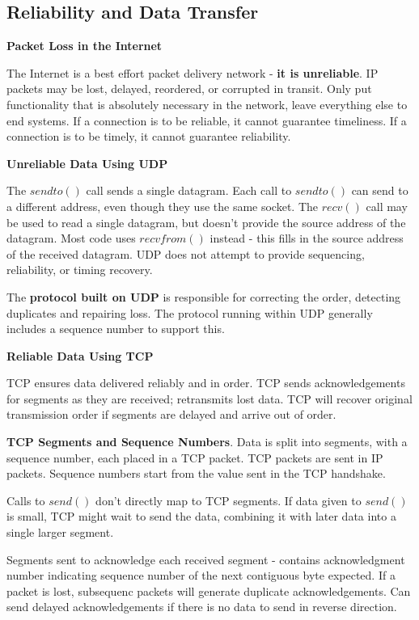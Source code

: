 \documentclass{article}
\begin{document}
\clearpage

\subsection*{Reliability and Data Transfer}

\textbf{Packet Loss in the Internet}

The Internet is a best effort packet delivery network {-} \textbf{it is unreliable}.
IP packets may be lost, delayed, reordered, or corrupted in transit.
Only put functionality that is absolutely necessary in the network, leave everything else to end systems.
If a connection is to be reliable, it cannot guarantee timeliness.
If a connection is to be timely, it cannot guarantee reliability.

\vspace{\baselineskip}
\textbf{Unreliable Data Using UDP}

The $sendto()$ call sends a single datagram.
Each call to $sendto()$ can send to a different address, even though they use the same socket.
The $recv()$ call may be used to read a single datagram, but doesn't provide the source address of the datagram.
Most code uses $recvfrom()$ instead {-} this fills in the source address of the received datagram.
UDP does not attempt to provide sequencing, reliability, or timing recovery.

The \textbf{protocol built on UDP} is responsible for correcting the order, detecting duplicates and repairing loss.
The protocol running within UDP generally includes a sequence number to support this.

\vspace{\baselineskip}
\textbf{Reliable Data Using TCP}

TCP ensures data delivered reliably and in order.
TCP sends acknowledgements for segments as they are received; retransmits lost data.
TCP will recover original transmission order if segments are delayed and arrive out of order.

\textbf{TCP Segments and Sequence Numbers}. Data is split into segments, with a sequence number, each placed in a TCP packet.
TCP packets are sent in IP packets.
Sequence numbers start from the value sent in the TCP handshake.

Calls to $send()$ don't directly map to TCP segments.
If data given to $send()$ is small, TCP might wait to send the data, combining it with later data into a single larger segment.

Segments sent to acknowledge each received segment {-} contains acknowledgment number indicating sequence number of the next
contiguous byte expected.
If a packet is lost, subsequenc packets will generate duplicate acknowledgements.
Can send delayed acknowledgements if there is no data to send in reverse direction.
\end{document}
